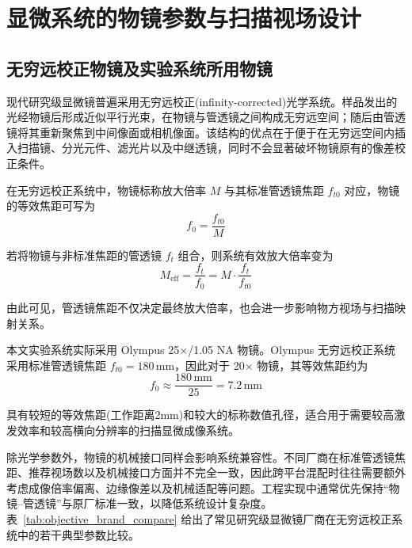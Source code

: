 \section{显微系统的物镜参数与扫描视场设计}\label{2.4}

\subsection{无穷远校正物镜及实验系统所用物镜}\label{2.4.1}

现代研究级显微镜普遍采用无穷远校正(infinity-corrected)光学系统。样品发出的光经物镜后形成近似平行光束，在物镜与管透镜之间构成无穷远空间；随后由管透镜将其重新聚焦到中间像面或相机像面。该结构的优点在于便于在无穷远空间内插入扫描镜、分光元件、滤光片以及中继透镜，同时不会显著破坏物镜原有的像差校正条件。

在无穷远校正系统中，物镜标称放大倍率 $M$ 与其标准管透镜焦距 $f_{t0}$ 对应，物镜的等效焦距可写为
\begin{equation}
f_{0}=\frac{f_{t0}}{M}
\label{eq:f0_def}
\end{equation}

若将物镜与非标准焦距的管透镜 $f_t$ 组合，则系统有效放大倍率变为
\begin{equation}
M_{\mathrm{eff}}=\frac{f_t}{f_0}=M\cdot\frac{f_t}{f_{t0}}
\label{eq:Meff_def}
\end{equation}

由此可见，管透镜焦距不仅决定最终放大倍率，也会进一步影响物方视场与扫描映射关系。

本文实验系统实际采用 Olympus 25$\times$/1.05 NA 物镜。Olympus 无穷远校正系统采用标准管透镜焦距 $f_{t0}=180\,\mathrm{mm}$，因此对于 20$\times$ 物镜，其等效焦距约为
\begin{equation}
f_0 \approx \frac{180\,\mathrm{mm}}{25}=7.2\,\mathrm{mm}
\label{eq:f0_olympus20x}
\end{equation}

具有较短的等效焦距(工作距离2mm)和较大的标称数值孔径，适合用于需要较高激发效率和较高横向分辨率的扫描显微成像系统。

除光学参数外，物镜的机械接口同样会影响系统兼容性。不同厂商在标准管透镜焦距、推荐视场数以及机械接口方面并不完全一致，因此跨平台混配时往往需要额外考虑成像倍率偏离、边缘像差以及机械适配等问题。工程实现中通常优先保持``物镜--管透镜''与原厂标准一致，以降低系统设计复杂度。表~\ref{tab:objective_brand_compare} 给出了常见研究级显微镜厂商在无穷远校正系统中的若干典型参数比较。

